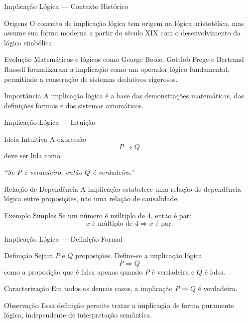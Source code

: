 \documentclass[9pt]{beamer}
\begin{document}
\begin{frame}{Implicação Lógica — Contexto Histórico}

\begin{block}{Origens}
O conceito de implicação lógica tem origem na lógica aristotélica,
mas assume sua forma moderna a partir do século XIX com o desenvolvimento
da lógica simbólica.
\end{block}

\begin{block}{Evolução}
Matemáticos e lógicos como George Boole, Gottlob Frege e Bertrand Russell
formalizaram a implicação como um operador lógico fundamental,
permitindo a construção de sistemas dedutivos rigorosos.
\end{block}

\begin{block}{Importância}
A implicação lógica é a base das demonstrações matemáticas,
das definições formais e dos sistemas axiomáticos.
\end{block}

\end{frame}
\begin{frame}{Implicação Lógica — Intuição}

\begin{block}{Ideia Intuitiva}
A expressão
\[
P \Rightarrow Q
\]
deve ser lida como:
\begin{center}
\emph{``Se $P$ é verdadeiro, então $Q$ é verdadeiro.''}
\end{center}
\end{block}

\begin{block}{Relação de Dependência}
A implicação estabelece uma relação de dependência lógica entre proposições,
não uma relação de causalidade.
\end{block}

\begin{block}{Exemplo Simples}
Se um número é múltiplo de $4$, então é par:
\[
x \text{ é múltiplo de } 4 \Rightarrow x \text{ é par}.
\]
\end{block}

\end{frame}
\begin{frame}{Implicação Lógica — Definição Formal}

\begin{block}{Definição}
Sejam $P$ e $Q$ proposições.
Define-se a implicação lógica
\[
P \Rightarrow Q
\]
como a proposição que é falsa apenas quando $P$ é verdadeira
e $Q$ é falsa.
\end{block}

\begin{block}{Caracterização}
Em todos os demais casos, a implicação $P \Rightarrow Q$ é verdadeira.
\end{block}

\begin{block}{Observação}
Essa definição permite tratar a implicação de forma puramente lógica,
independente de interpretação semântica.
\end{block}

\end{frame}
\end{document}
